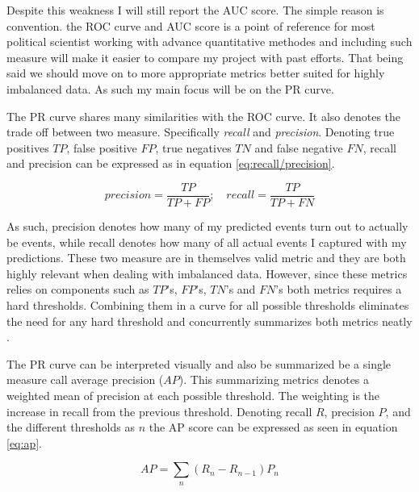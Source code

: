 \documentclass[a4paper]{article}
\begin{document}
Despite this weakness I will still report the AUC score. The simple reason is convention. the ROC curve and AUC score is a point of reference for most political scientist working with advance quantitative methodes and including such measure will make it easier to compare my project with past efforts. That being said we should move on to more appropriate metrics better suited for highly imbalanced data. As such my main focus will be on the PR curve.\par

The PR curve shares many similarities with the ROC curve. It also denotes the trade off between two measure. Specifically \emph{recall} and \emph{precision}. Denoting true positives $TP$, false positive $FP$, true negatives $TN$ and false negative $FN$, recall and
precision can be expressed as in equation \ref{eq:recall/precision}.\par%

\[
precision = \frac{TP}{TP+FP}; \quad recall = \frac{TP}{TP+FN} \tag{16} \label{eq:recall/precision}
\]


As such, precision denotes how many of my predicted events turn out to actually be events, while recall denotes how many of all actual events I captured with my predictions. These two measure are in themselves valid metric and they are both highly relevant when dealing with imbalanced data. However, since these metrics relies on components such as $TP$'s, $FP$'s, $TN$'s and $FN$'s both metrics requires a hard thresholds. Combining them in a curve for all possible thresholds eliminates the need for any hard threshold and concurrently summarizes both metrics neatly \citep[1287]{He_2008}.\par

The PR curve can be interpreted visually and also be summarized be a single measure call average precision ($AP$). This summarizing metrics denotes a weighted mean of precision at each possible threshold. The weighting is the increase in recall from the previous threshold. Denoting recall $R$, precision $P$, and the different thresholds as $n$ the AP score can be expressed as seen in equation \ref{eq:ap}.\par

\[
AP = \sum_n (R_n-R_{n-1})P_n \tag{17} \label{eq:ap}
\]
\end{document}
